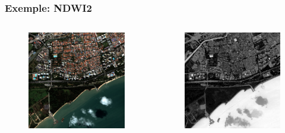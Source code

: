 \documentclass[compress,handout]{beamer}
\begin{document}
\begin{frame}
\frametitle{Exemple: NDWI2}
\begin{columns}
\begin{column}{0.5\textwidth}
\begin{figure}[]
  \includegraphics[width=1.0\textwidth]{radio2-extract-3b.jpg}
\end{figure}
\end{column}
\begin{column}{0.5\textwidth}
\begin{figure}[]
  \includegraphics[width=1.0\textwidth]{Radiometry-NDWI2.jpg}
\end{figure}
\end{column}
\end{columns}
\end{frame}
\end{document}
